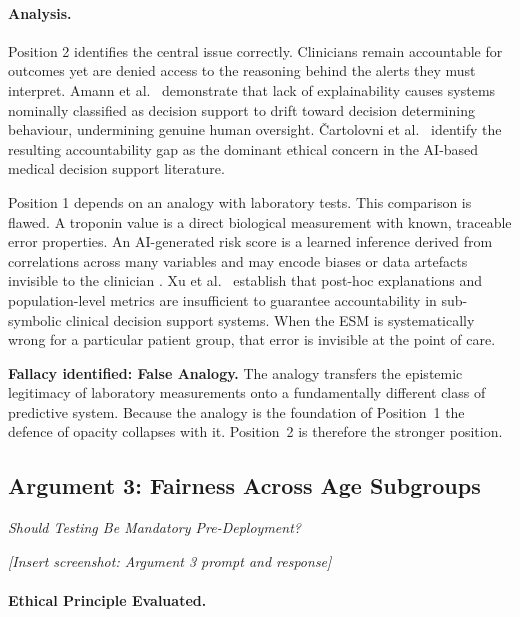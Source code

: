 \documentclass[]{UCD_CS_41820_Report}
\begin{document}
\paragraph{Analysis.}

Position 2 identifies the central issue correctly. Clinicians remain accountable
for outcomes yet are denied access to the reasoning behind the alerts they must
interpret. Amann et al.\ \cite{amann2022} demonstrate that lack of explainability
causes systems nominally classified as decision support to drift toward decision
determining behaviour, undermining genuine human oversight. \v{C}artolovni et al.\
\cite{cartoloni2022} identify the resulting accountability gap as the dominant
ethical concern in the AI-based medical decision support literature.

Position 1 depends on an analogy with laboratory tests. This comparison is flawed.
A troponin value is a direct biological measurement with known, traceable error
properties. An AI-generated risk score is a learned inference derived from
correlations across many variables and may encode biases or data artefacts invisible
to the clinician \cite{cull2023}. Xu et al.\ \cite{xu2023} establish that post-hoc
explanations and population-level metrics are insufficient to guarantee
accountability in sub-symbolic clinical decision support systems. When the ESM is
systematically wrong for a particular patient group, that error is invisible at the
point of care.
\par\medskip
\textbf{Fallacy identified: False Analogy.} The analogy transfers the epistemic
legitimacy of laboratory measurements onto a fundamentally different class of
predictive system. Because the analogy is the foundation of Position~1 the defence
of opacity collapses with it. Position~2 is therefore the stronger position.

\subsection*{Argument 3: Fairness Across Age Subgroups}
\textit{Should Testing Be Mandatory Pre-Deployment?}

\noindent\textit{[Insert screenshot: Argument 3 prompt and response]}

\paragraph{Ethical Principle Evaluated.}~\\
\end{document}
